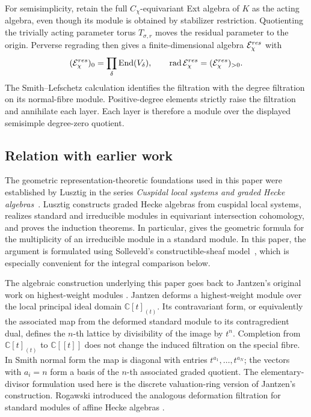 \documentclass[10pt,a4paper]{amsart}
\begin{document}
For semisimplicity, retain the full $C_\chi$-equivariant Ext algebra of
$K$ as the acting algebra, even though its module is obtained by
stabilizer restriction.  Quotienting the trivially acting parameter
torus $T_{\sigma,r}$ moves the residual parameter to the origin.
Perverse regrading then gives a finite-dimensional algebra
$\mathcal E_\chi^{\rm res}$ with
\[
 (\mathcal E_\chi^{\rm res})_0
   =\prod_\delta\operatorname{End}(V_\delta),\qquad
 \operatorname{rad}\mathcal E_\chi^{\rm res}
   =(\mathcal E_\chi^{\rm res})_{>0}.
\]
The Smith--Lefschetz calculation identifies the filtration with the
degree filtration on its normal-fibre module.  Positive-degree
elements strictly raise the filtration and annihilate each layer.
Each layer is therefore a module over the displayed semisimple
degree-zero quotient.

\subsection*{Relation with earlier work}

The geometric representation-theoretic foundations used in this paper were
established by Lusztig in the series \emph{Cuspidal local systems and graded
Hecke algebras}~\cite{LusztigCuspidalI,LusztigCuspidalII,LusztigCuspidalIII}.
Lusztig constructs graded Hecke algebras from cuspidal
local systems, realizes standard and irreducible modules in equivariant
intersection cohomology, and proves the induction theorems.  In particular,
\cite[Proposition~10.5 and Corollary~10.7]{LusztigCuspidalII} gives the
geometric formula for the multiplicity of an irreducible module in a standard
module.  In this paper, the argument is formulated using Solleveld's constructible-sheaf
model~\cite{Solleveld}, which is especially
convenient for the integral comparison below.  %

The algebraic construction underlying this paper goes back to
Jantzen's original work on highest-weight modules
\cite{JantzenForms,Jantzen}.  Jantzen deforms a highest-weight module over
the local principal ideal domain $\mathbb C[t]_{(t)}$.  Its contravariant
form, or equivalently the associated map from the deformed standard module
to its contragredient dual, defines the $n$-th lattice by divisibility of the
image by $t^n$.  Completion from $\mathbb C[t]_{(t)}$ to $\mathbb C[[t]]$
does not change the induced filtration on the special fibre.  In Smith
normal form the map is diagonal with entries $t^{a_1},\ldots,t^{a_N}$;
the vectors with $a_i=n$ form a basis of the $n$-th associated graded
quotient.  The elementary-divisor formulation used here is the discrete
valuation-ring version of Jantzen's construction. %
Rogawski introduced the analogous
deformation filtration for standard modules of affine Hecke algebras
\cite{Rogawski}.
\end{document}
